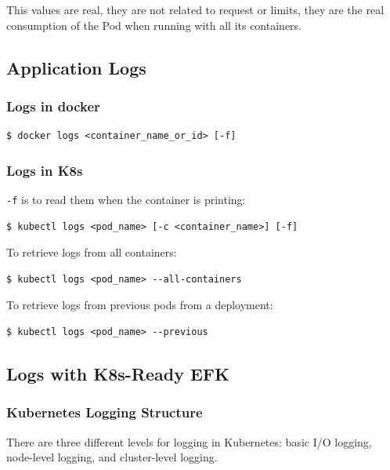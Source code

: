 \documentclass{article}
\newenvironment{blocktemplate}[1]{%
    \tcolorbox[beamer,%
    noparskip,breakable,
    colframe=Blue,%
    colbacklower=LimeGreen!75!LightGreen,%
    title=#1]}%
    {\endtcolorbox}
\newenvironment{codetemplate}[1][]{%
  \mybasecolorbox[#1]
  \itshape
}{%
  \endmybasecolorbox
}
\begin{document}
\begin{blocktemplate}{NOTE}
This values are real, they are not related to request or limits, they are the real consumption of the Pod when running with all its containers.
\end{blocktemplate}

\subsection{Application Logs}

\subsubsection{Logs in docker}
\begin{codetemplate}{}
\begin{verbatim}
$ docker logs <container_name_or_id> [-f]
\end{verbatim}
\end{codetemplate}

\subsubsection{Logs in K8s}
\verb|-f| is to read them when the container is printing:
\begin{codetemplate}{}
\begin{verbatim}
$ kubectl logs <pod_name> [-c <container_name>] [-f]
\end{verbatim}
\end{codetemplate}

To retrieve logs from all containers:
\begin{codetemplate}{}
\begin{verbatim}
$ kubectl logs <pod_name> --all-containers
\end{verbatim}
\end{codetemplate}

To retrieve logs from previous pods from a deployment:
\begin{codetemplate}{}
\begin{verbatim}
$ kubectl logs <pod_name> --previous
\end{verbatim}
\end{codetemplate}


\subsection{Logs with K8s-Ready EFK}

\subsubsection{Kubernetes Logging Structure}
There are three different levels for logging in Kubernetes: basic I/O logging, node-level logging, and cluster-level logging.
\end{document}

